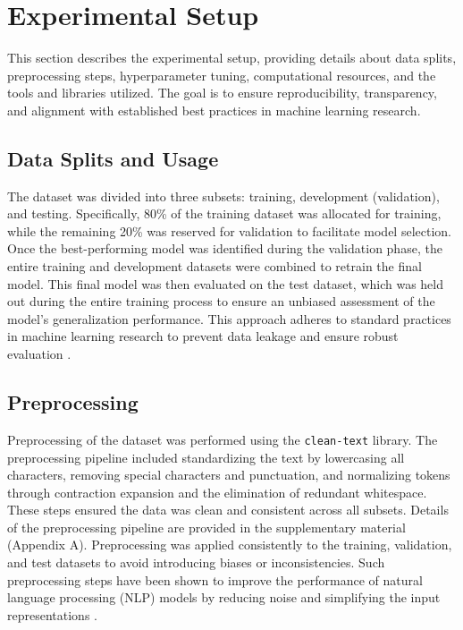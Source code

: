 \section{Experimental Setup}

This section describes the experimental setup, providing details about data splits, preprocessing steps, hyperparameter tuning, computational resources, and the tools and libraries utilized. The goal is to ensure reproducibility, transparency, and alignment with established best practices in machine learning research.


\subsection{Data Splits and Usage}
The dataset was divided into three subsets: training, development (validation), and testing. Specifically, 80\% of the training dataset was allocated for training, while the remaining 20\% was reserved for validation to facilitate model selection. Once the best-performing model was identified during the validation phase, the entire training and development datasets were combined to retrain the final model. This final model was then evaluated on the test dataset, which was held out during the entire training process to ensure an unbiased assessment of the model's generalization performance. This approach adheres to standard practices in machine learning research to prevent data leakage and ensure robust evaluation \citep{Goodfellow-et-al-2016}.

\subsection{Preprocessing}

Preprocessing of the dataset was performed using the \texttt{clean-text} library. The preprocessing pipeline included standardizing the text by lowercasing all characters, removing special characters and punctuation, and normalizing tokens through contraction expansion and the elimination of redundant whitespace. These steps ensured the data was clean and consistent across all subsets. Details of the preprocessing pipeline are provided in the supplementary material (Appendix A). Preprocessing was applied consistently to the training, validation, and test datasets to avoid introducing biases or inconsistencies. Such preprocessing steps have been shown to improve the performance of natural language processing (NLP) models by reducing noise and simplifying the input representations \citep{Zhang2020DataPrep}.


